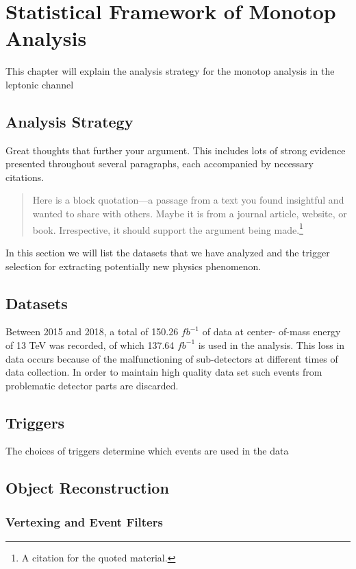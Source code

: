 \chapter{Statistical Framework of Monotop Analysis}
\label{chapter:five}
This chapter will explain the analysis strategy for the monotop analysis in the leptonic channel
\section{Analysis Strategy}

Great thoughts that further your argument. This includes lots of strong evidence presented throughout several paragraphs, each accompanied by necessary citations.
\begin{quotation}
    \noindent Here is a block quotation---a passage from a text you found insightful and wanted to share with others. Maybe it is from a journal article, website, or book. Irrespective, it should support the argument being made.\footnote{A citation for the quoted material.}
\end{quotation}




In this section we will list the datasets that we have analyzed and the trigger selection for extracting potentially new physics phenomenon.
\section{Datasets}
Between 2015 and 2018, a total of 150.26 $fb^{-1}$ of data at center- of-mass energy of 13 TeV was recorded, of which 137.64 $fb^{-1}$ is used in the analysis. This loss in data occurs because of the malfunctioning of sub-detectors at different times of data collection. In order to maintain high quality data set such events from problematic detector parts are discarded.
\section{Triggers}

The choices of triggers determine which events are used in the data
\section{Object Reconstruction}
\subsection{Vertexing and Event Filters}
